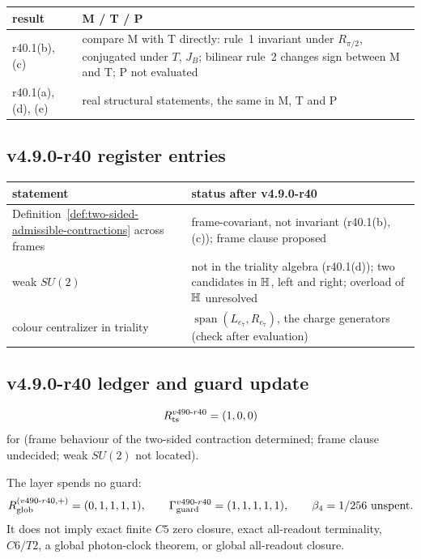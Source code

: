 \begin{center}
\small
\begin{tabular}{@{}>{\raggedright\arraybackslash}p{}>{\raggedright\arraybackslash}p{}@{}}
\toprule
result & M / T / P\\
\midrule
r40.1(b), (c) & compare M with T directly: rule~1 invariant under \(R_{\pi/2}\), conjugated under \(T\), \(J_B\); bilinear rule~2 changes sign between M and T; P not evaluated\\
r40.1(a), (d), (e) & real structural statements, the same in M, T and P\\
\bottomrule
\end{tabular}
\end{center}

\subsection*{v4.9.0-r40 register entries}
\label{subsec:v490-r40-register}

\begin{center}
\small
\begin{tabular}{@{}>{\raggedright\arraybackslash}p{}>{\raggedright\arraybackslash}p{}@{}}
\toprule
statement & status after v4.9.0-r40\\
\midrule
Definition~\ref{def:two-sided-admissible-contractions} across frames & frame-covariant, not invariant (r40.1(b), (c)); frame clause proposed\\
weak \(SU(2)\) & not in the triality algebra (r40.1(d)); two candidates in \(\mathbb{H}\), left and right; overload of \(\mathbb{H}\) unresolved\\
colour centralizer in triality & \(\operatorname{span}(L_{e_7},R_{e_7})\), the charge generators (check after evaluation)\\
\bottomrule
\end{tabular}
\end{center}

\subsection*{v4.9.0-r40 ledger and guard update}
\label{subsec:v490-r40-ledger-guard}

\[
R_{\rm ts}^{v490\text{-}r40}=(1,0,0)
\]
for (frame behaviour of the two-sided contraction determined; frame clause undecided; weak \(SU(2)\) not located).

The layer spends no guard:
\[
R_{\rm glob}^{(v490\text{-}r40,+)}=(0,1,1,1,1),
\qquad
\Gamma_{\rm guard}^{v490\text{-}r40}=(1,1,1,1,1),
\qquad
\beta_4=1/256\ \text{unspent}.
\]
It does not imply exact finite \(C5\) zero closure, exact all-readout terminality,
\(C6/T2\), a global photon-clock theorem, or global all-readout closure.
\clearpage
